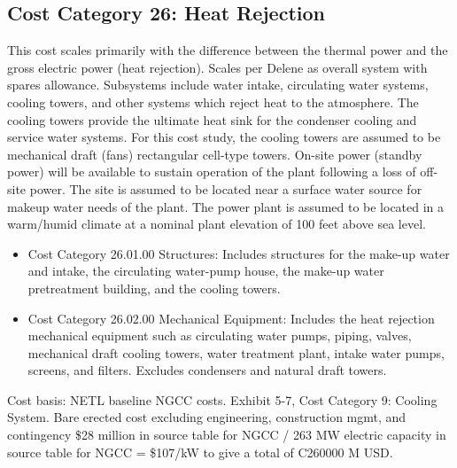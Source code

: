 \subsection{Cost Category 26: Heat Rejection} 

This cost scales primarily with the difference between the thermal power and the gross electric power (heat rejection). Scales per Delene as overall system with spares allowance.  Subsystems include water intake, circulating water systems, cooling towers, and other systems which reject heat to the atmosphere. The cooling towers provide the ultimate heat sink for the condenser cooling and service water systems.  For this cost study, the cooling towers are assumed to be mechanical draft (fans) rectangular cell-type towers.  On-site power (standby power) will be available to sustain operation of the plant following a loss of off-site power. The site is assumed to be located near a surface water source for makeup water needs of the plant.  The power plant is assumed to be located in a warm/humid climate at a nominal plant elevation of 100 feet above sea level.  
\begin{itemize}
    \item Cost Category 26.01.00 Structures: Includes structures for the make-up water and intake, the circulating
water-pump house, the make-up water pretreatment building, and the cooling towers.
\item Cost Category 26.02.00 Mechanical Equipment: Includes the heat rejection mechanical equipment such as circulating water pumps, piping, valves, mechanical draft cooling towers, water treatment plant, intake water pumps, screens, and filters. Excludes condensers and natural draft towers.
\end{itemize}

Cost basis: NETL baseline NGCC costs. Exhibit 5-7, Cost Category 9: Cooling System. Bare erected cost excluding engineering, construction mgmt, and contingency \$28 million in source table for NGCC / 263 MW electric capacity in source table for NGCC = \$107/kW to give a total of C260000 M USD.









